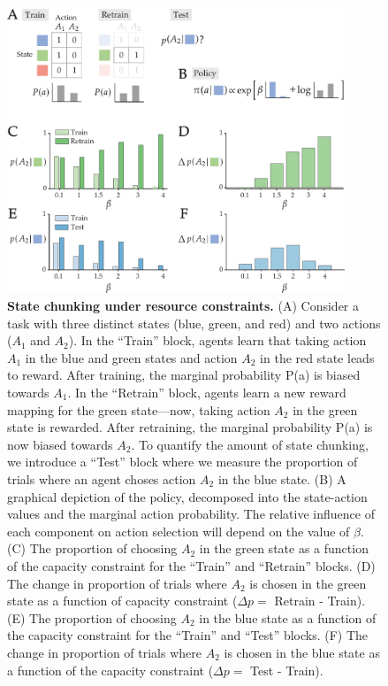 \documentclass[11pt]{article}
\begin{document}
\begin{figure}
    \centering
    \includegraphics[width=0.9\textwidth]{figs/sc.pdf}
            \caption{\textbf{State chunking under resource constraints.} (A) Consider a task with three distinct states (blue, green, and red) and two actions ($A_1$ and $A_2$). In the ``Train'' block, agents learn that taking action $A_1$ in the blue and green states and action $A_2$ in the red state leads to reward. After training, the marginal probability P(a) is biased towards $A_1$. In the ``Retrain'' block, agents learn a new reward mapping for the green state---now, taking action $A_2$ in the green state is rewarded. After retraining, the marginal probability P(a) is now biased towards $A_2$. To quantify the amount of state chunking, we introduce a ``Test'' block where we measure the proportion of trials where an agent choses action $A_2$ in the blue state. (B) A graphical depiction of the policy, decomposed into the state-action values and the marginal action probability. The relative influence of each component on action selection will depend on the value of $\beta$. (C) The proportion of choosing $A_2$ in the green state as a function of the capacity constraint for the ``Train'' and ``Retrain'' blocks. (D) The change in proportion of trials where $A_2$ is chosen in the green state as a function of capacity constraint ($\Delta p = $ Retrain - Train). (E) The proportion of choosing $A_2$ in the blue state as a function of the capacity constraint for the ``Train'' and ``Test'' blocks. (F) The change in proportion of trials where $A_2$ is chosen in the blue state as a function of the capacity constraint ($\Delta p = $ Test - Train).}
    \label{fig:sc1}
\end{figure}
\end{document}

